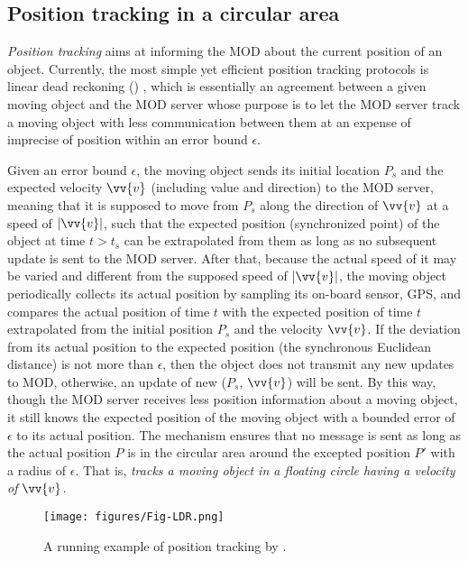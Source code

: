 \subsection{Position tracking in a circular area}

\textit{Position tracking} aims at informing the MOD about the current position of an object. Currently, the most simple yet efficient position tracking protocols is linear dead reckoning (\ldr) \cite{ Wolfson:PositionTracking}, which is essentially an agreement between a given moving object and the MOD server whose purpose is to let the MOD server track a moving object with less communication between them at an expense of imprecise of position within an error bound $\epsilon$.  

Given an error bound $\epsilon$, the moving object sends its initial location $P_s$ and the expected velocity $\vv{v}$
(including value and direction) to the MOD server, meaning that it is supposed to move from $P_s$ along the direction of $\vv{v}$ at a speed of $|\vv{v}|$, such that the expected position (\ie synchronized point) of the object at time $t>t_s$ can be extrapolated from them as long as no subsequent update is sent to the MOD server. 
After that, because the actual speed of it may be varied and different from the supposed speed of $|\vv{v}|$, the moving object periodically collects its actual position by sampling its on-board sensor, \eg GPS, and compares the actual position of time $t$ with the expected position of time $t$ extrapolated from the initial position $P_s$ and the velocity $\vv{v}$. 
If the deviation from its actual position to the expected position (\ie the synchronous Euclidean distance) is not more than $\epsilon$, then the object does not transmit any new updates to MOD, otherwise, an update of new ($P_s$, $\vv{v}$) will be sent.
%
By this way, though the MOD server receives less position information about a moving object, it still knows the expected position of the moving object with a bounded error of $\epsilon$ to its actual position. The \ldr mechanism ensures that no message is sent as long as the actual position $P$ is in the circular area around the excepted position $P'$ with a radius of $\epsilon$. That is, \emph{\ldr tracks a moving object in a floating circle having a velocity of $\vv{v}$.}

\begin{figure}[tb!]
	\centering
	\texttt{[image: figures/Fig-LDR.png]}
	\vspace{-1ex}
	\caption{\small A running example of position tracking by \ldr. }
	\vspace{-1.5ex}
	\label{fig:ldr}
\end{figure}

